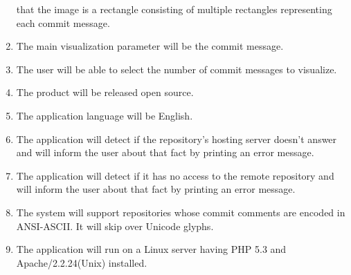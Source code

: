 \documentclass[12pt]{scrartcl}
\begin{document}
\begin{enumerate}
	that the image is a rectangle consisting of multiple rectangles
	representing each commit message.
\item The main visualization parameter will be the commit message.
\item The user will be able to select the number of commit messages to visualize. 
\item The product will be released open source.
\item The application language will be English.
\item The application will detect if the repository's hosting server doesn't answer and will inform the user about that fact by printing an error message.
\item The application will detect if it has no access to the remote repository and will inform the user about that fact by printing an error message.
\item The system will support repositories whose commit comments are encoded in
	ANSI-ASCII. It will skip over Unicode glyphs.
\item The application will run on a Linux server having PHP 5.3 and Apache/2.2.24(Unix) installed.
\end{enumerate}
\end{document}
